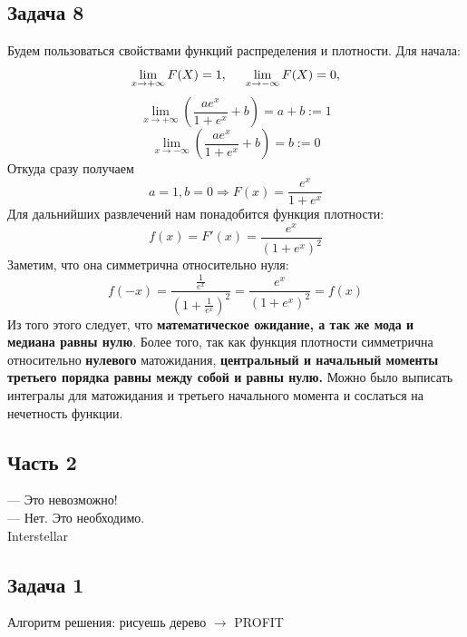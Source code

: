 \documentclass[a4paper,12pt]{article}
\theoremstyle{plain}                         %
\theoremstyle{definition}                  %
\theoremstyle{remark}                      %
\begin{document}
\begin{enumerate}
\subsection*{Задача 8}
Будем пользоваться свойствами функций распределения и плотности. Для начала:
$$
\lim\limits_{x \rightarrow +\infty} F(X) = 1, \hspace{0.5cm} \lim\limits_{x \rightarrow -\infty} F(X) = 0,
$$
$$
\lim\limits_{x \rightarrow +\infty} \left(\frac{ae^x}{1+e^x}+b\right) = a+b := 1
$$
$$
\lim\limits_{x \rightarrow -\infty} \left(\frac{ae^x}{1+e^x}+b\right) = b :=0
$$
Откуда сразу получаем $$a =1, b = 0 \Rightarrow F(x) = \frac{e^x}{1+e^x}$$
Для дальнийших развлечений нам понадобится функция плотности:
$$
f(x) = F'(x) = \frac{e^x}{(1+e^x)^2}
$$
 Заметим, что она симметрична относительно нуля:
 $$
 f(-x) = \frac{\frac{1}{e^x}}{\left(1+\frac{1}{e^x}\right)^2} = \frac{e^x}{(1+e^x)^2} = f(x)
 $$
 Из того этого следует, что \textbf{математическое ожидание, а так же мода и медиана равны нулю}. Более того, так как функция плотности симметрична относительно \textbf{нулевого} матожидания, \textbf{центральный и начальный моменты третьего порядка равны между собой и равны нулю.} Можно было выписать интегралы для матожидания и третьего начального момента и сослаться на нечетность функции.
 
\end{enumerate}

\newpage

\begin{center}
\section*{Часть 2}
\end{center}

\begin{flushright}
 --- Это невозможно! \\
--- Нет. Это необходимо.\\
\textcopyright \hspace{0.1cm} Interstellar
\end{flushright}
\subsection*{Задача 1}
Алгоритм решения: рисуешь дерево $\rightarrow$ PROFIT 

\begin{center}


\end{center}
\end{document}
